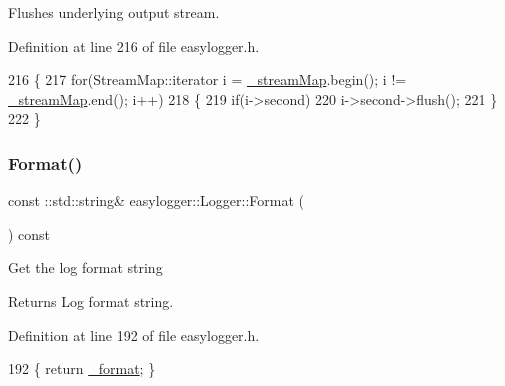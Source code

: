 Flushes underlying output stream. 



Definition at line 216 of file easylogger.\+h.


\begin{DoxyCode}
216                      \{
217             \textcolor{keywordflow}{for}(StreamMap::iterator i = \mbox{\hyperlink{classeasylogger_1_1_logger_a9290bed24c12786abef2c421158268f8}{\_streamMap}}.begin(); i != 
      \mbox{\hyperlink{classeasylogger_1_1_logger_a9290bed24c12786abef2c421158268f8}{\_streamMap}}.end(); i++)
218             \{
219                 \textcolor{keywordflow}{if}(i->second)
220                     i->second->flush();
221             \}
222         \}
\end{DoxyCode}
\mbox{\label{classeasylogger_1_1_logger_a5289aa36c7ae745fa960af5b59a6ed54}} 
\subsubsection{\texorpdfstring{Format()}{Format()}\hspace{0.1cm}{\footnotesize\ttfamily [1/2]}}
{\footnotesize\ttfamily const \+::std\+::string\& easylogger\+::\+Logger\+::\+Format (\begin{DoxyParamCaption}{ }\end{DoxyParamCaption}) const\hspace{0.3cm}{\ttfamily [inline]}}

Get the log format string

\begin{DoxyReturn}{Returns}
Log format string. 
\end{DoxyReturn}


Definition at line 192 of file easylogger.\+h.


\begin{DoxyCode}
192 \{ \textcolor{keywordflow}{return} \mbox{\hyperlink{classeasylogger_1_1_logger_ab45891277952285a459ec39a03a91226}{\_format}}; \}
\end{DoxyCode}
\mbox{\label{classeasylogger_1_1_logger_ab9395d1199d0ef5539f14552834d42a7}} 
